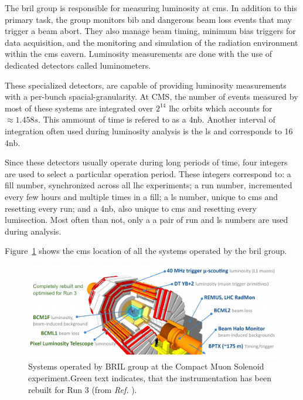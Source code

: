 

The \acrfull{bril} group is responsible for measuring luminosity at \acrshort{cms}. In addition to this primary task, the group monitors \acrfull{bib} and dangerous beam loss events that may trigger a beam abort. They also manage beam timing, minimum bias triggers for data acquisition, and the monitoring and simulation of the radiation environment within the \acrshort{cms} cavern. Luminosity measurements are done with the use of dedicated detectors called luminometers.

These specialized detectors, are capable of providing luminosity measurements with a per-bunch spacial-granularity. At CMS, the number of events measured by most of these systems are integrated over $2^{14}$ \acrshort{lhc} orbits which accounts for $\approx 1.458s$. This ammount of time is refered to as a \acrfull{4nb}. Another interval of integration often used during luminosity analysis is the \acrfull{ls} and corresponds to 16 \acrshort{4nb}.

Since these detectors usually operate during long periods of time, four integers are used to select a particular operation period. These integers correspond to: a fill number, synchronized across all \acrshort{lhc} experiments; a run number, incremented every few hours and multiple times in a fill; a \acrshort{ls} number, unique to \acrshort{cms} and resetting every run; and a \acrshort{4nb}, also unique to \acrshort{cms} and resetting every lumisection. Most often than not, only a a pair of run and \acrshort{ls} numbers are used during analysis.

Figure~\ref{fig:cms_bril_detectors} shows the \acrshort{cms} location of all the systems operated by the \acrshort{bril} group.

\begin{figure}[h]
	\centering
	\includegraphics[width=\textwidth]{images/assets/cms_bril_detectors.png}
	\caption[BRIL systems at CMS]{Systems operated by BRIL group at the Compact Muon Solenoid experiment.Green text indicates, that the instrumentation has been rebuilt for Run 3 (from \textit{Ref.} \cite{Saariokari:2826125}).}
	\label{fig:cms_bril_detectors}
\end{figure}

